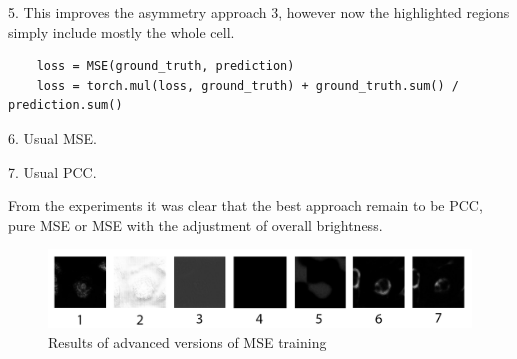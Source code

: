 5. This improves the asymmetry approach 3, however now the highlighted regions simply include mostly the whole cell.
\begin{lstlisting}
	loss = MSE(ground_truth, prediction)
	loss = torch.mul(loss, ground_truth) + ground_truth.sum() / prediction.sum()
\end{lstlisting}

6. Usual MSE.

7. Usual PCC.

From the experiments it was clear that the best approach remain to be PCC, pure MSE or MSE with the adjustment of overall brightness.

\begin{figure}[H]
	\begin{center}
		\includegraphics[width=\linewidth]{bilder/golgi/asymmetrical-predictions.png}
		\caption{Results of advanced versions of MSE training}\label{fig:golgi-asymmetrical-predictions}
	\end{center}
\end{figure} 